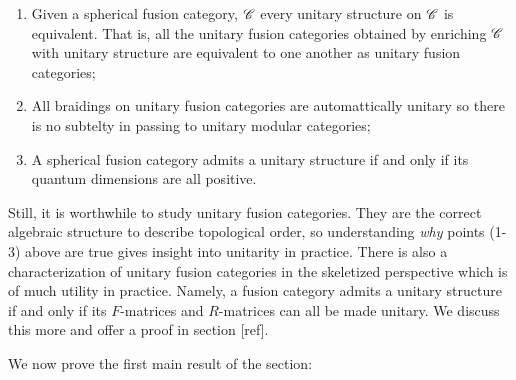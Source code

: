 \begin{enumerate}
\item Given a spherical fusion category, $\mathscr{C}$ every unitary structure on $\mathscr{C}$ is equivalent. That is, all the unitary fusion categories obtained by enriching $\mathscr{C}$ with unitary structure are equivalent to one another as unitary fusion categories;

\item All braidings on unitary fusion categories are automattically unitary so there is no subtelty in passing to unitary modular categories;

\item A spherical fusion category admits a unitary structure if and only if its quantum dimensions are all positive.
\end{enumerate}

Still, it is worthwhile to study unitary fusion categories. They are the correct algebraic structure to describe topological order, so understanding \textit{why} points (1-3) above are true gives insight into unitarity in practice. There is also a characterization of unitary fusion categories in the skeletized perspective which is of much utility in practice. Namely, a fusion category admits a unitary structure if and only if its $F$-matrices and $R$-matrices can all be made unitary. We discuss this more and offer a proof in section [ref].

We now prove the first main result of the section:

